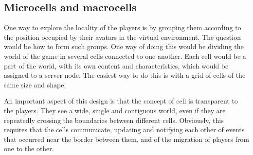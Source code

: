 \subsection{Microcells and macrocells}
\label{sec:micro}


One way to explore the locality of the players is by grouping them according to the position occupied by their avatars in the virtual environment. The question would be how to form such groups. One way of doing this would be dividing the world of the game in several cells connected to one another. Each cell would be a part of the world, with its own content and characteristics, which would be assigned to a server node. The easiest way to do this is with a grid of cells of the same size and shape.



An important aspect of this design is that the concept of cell is transparent to the players. They see a wide, single and contiguous world, even if they are repeatedly crossing the boundaries between different cells. Obviously, this requires that the cells communicate, updating and notifying each other of events that occurred near the border between them, and of the migration of players from one to the other.

